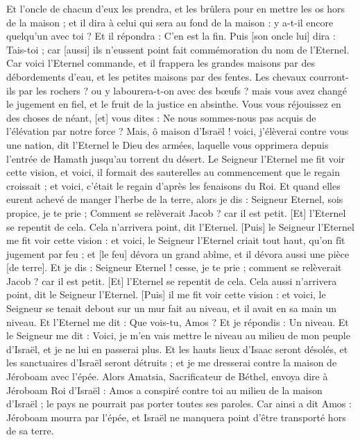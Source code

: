 \begin{multicols}{2}
Et l'oncle de chacun d'eux les prendra, et les brûlera pour en mettre les os hors de la maison ; et il dira à celui qui sera au fond de la maison : y a-t-il encore quelqu'un avec toi ? Et il répondra : C'en est la fin. Puis [son oncle lui] dira : Tais-toi ; car [aussi] ils n'eussent point fait commémoration du nom de l'Eternel.
Car voici l'Eternel commande, et il frappera les grandes maisons par des débordements d'eau, et les petites maisons par des fentes.
Les chevaux courront-ils par les rochers ? ou y labourera-t-on avec des bœufs ? mais vous avez changé le jugement en fiel, et le fruit de la justice en absinthe.
Vous vous réjouissez en des choses de néant, [et] vous dites : Ne nous sommes-nous pas acquis de l'élévation par notre force ?
Mais, ô maison d'Israël ! voici, j'élèverai contre vous une nation, dit l'Eternel le Dieu des armées, laquelle vous opprimera depuis l'entrée de Hamath jusqu'au torrent du désert.
\VerseOne{}Le Seigneur l'Eternel me fit voir cette vision, et voici, il formait des sauterelles au commencement que le regain croissait ; et voici, c'était le regain d'après les fenaisons du Roi.
Et quand elles eurent achevé de manger l'herbe de la terre, alors je dis : Seigneur Eternel, sois propice, je te prie ; Comment se relèverait Jacob ? car il est petit.
[Et] l'Eternel se repentit de cela. Cela n'arrivera point, dit l'Eternel.
[Puis] le Seigneur l'Eternel me fit voir cette vision : et voici, le Seigneur l'Eternel criait tout haut, qu'on fît jugement par feu ; et [le feu] dévora un grand abîme, et il dévora aussi une pièce [de terre].
Et je dis : Seigneur Eternel ! cesse, je te prie ; comment se relèverait Jacob ? car il est petit.
[Et] l'Eternel se repentit de cela. Cela aussi n'arrivera point, dit le Seigneur l'Eternel.
[Puis] il me fit voir cette vision : et voici, le Seigneur se tenait debout sur un mur fait au niveau, et il avait en sa main un niveau.
Et l'Eternel me dit : Que vois-tu, Amos ? Et je répondis : Un niveau. Et le Seigneur me dit : Voici, je m'en vais mettre le niveau au milieu de mon peuple d'Israël, et je ne lui en passerai plus.
Et les hauts lieux d'Isaac seront désolés, et les sanctuaires d'Israël seront détruits ; et je me dresserai contre la maison de Jéroboam avec l'épée.
Alors Amatsia, Sacrificateur de Béthel, envoya dire à Jéroboam Roi d'Israël : Amos a conspiré contre toi au milieu de la maison d'Israël ; le pays ne pourrait pas porter toutes ses paroles.
Car ainsi a dit Amos : Jéroboam mourra par l'épée, et Israël ne manquera point d'être transporté hors de sa terre.

\end{multicols}
